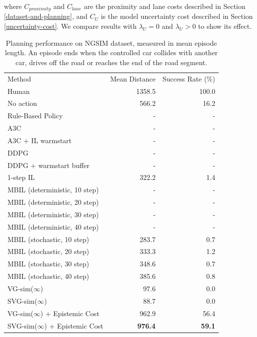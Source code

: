 \documentclass{article} %
\begin{document}
    where $C_{proximity}$ and $C_{lane}$ are the proximity and lane costs described in Section \ref{dataset-and-planning}, and $C_U$ is the model uncertainty cost described in Section \ref{uncertainty-cost}. We compare results with $\lambda_U = 0$ and $\lambda_U > 0$ to show its effect.



  \begin{table}[t]
    \centering
  \begin{tabular}{|lrr|}
    \hline
    Method & Mean Distance & Success Rate (\%)  \\
    \hhline{|===|}
    Human & 1358.5 & 100.0 \\
    \hline
    No action & 566.2 & 16.2 \\
    Rule-Based Policy & - & - \\
    \hline
    A3C & - & - \\
    A3C + IL warmstart & - & - \\
    DDPG & - & - \\
    DDPG + warmstart buffer & - & - \\
    \hline
    1-step IL & 322.2 & 1.4 \\
    MBIL (deterministic, 10 step) & - & - \\
    MBIL (deterministic, 20 step) & - & - \\
    MBIL (deterministic, 30 step) & - & - \\
    MBIL (deterministic, 40 step) & - & - \\    
    MBIL (stochastic, 10 step) & 283.7 & 0.7 \\
    MBIL (stochastic, 20 step) & 333.3 & 1.2 \\
    MBIL (stochastic, 30 step) & 348.6 & 0.7 \\
    MBIL (stochastic, 40 step) & 385.6 & 0.8 \\
    \hline
    VG-sim($\infty$) & 97.6 & 0.0 \\
    SVG-sim($\infty$) & 88.7 & 0.0 \\
    VG-sim($\infty$) + Epistemic Cost & 962.9 & 56.4 \\
    SVG-sim($\infty$) + Epistemic Cost & \textbf{976.4} & \textbf{59.1} \\
    \hline
  \end{tabular}
  \caption{Planning performance on NGSIM dataset, measured in mean episode length. An episode ends when the controlled car collides with another car, drives off the road or reaches the end of the road segment.}
  \label{main-table}
  \end{table}
\end{document}
